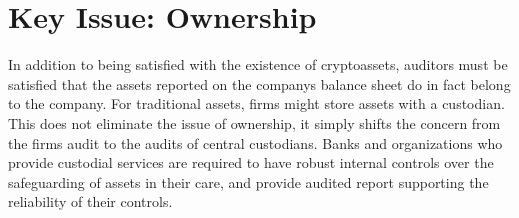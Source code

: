 
\section{Key Issue: Ownership}
In addition to being satisfied with the existence of cryptoassets, auditors must be satisfied that the assets reported on the company\textquotesingle s balance sheet do in fact belong to the company. For traditional assets, firms might store assets with a custodian. This does not eliminate the issue of ownership, it simply shifts the concern from the firm\textquotesingle s audit to the audits of central custodians. Banks and organizations who provide custodial services are required to have robust internal controls over the safeguarding of assets in their care, and provide audited report supporting the reliability of their controls.

